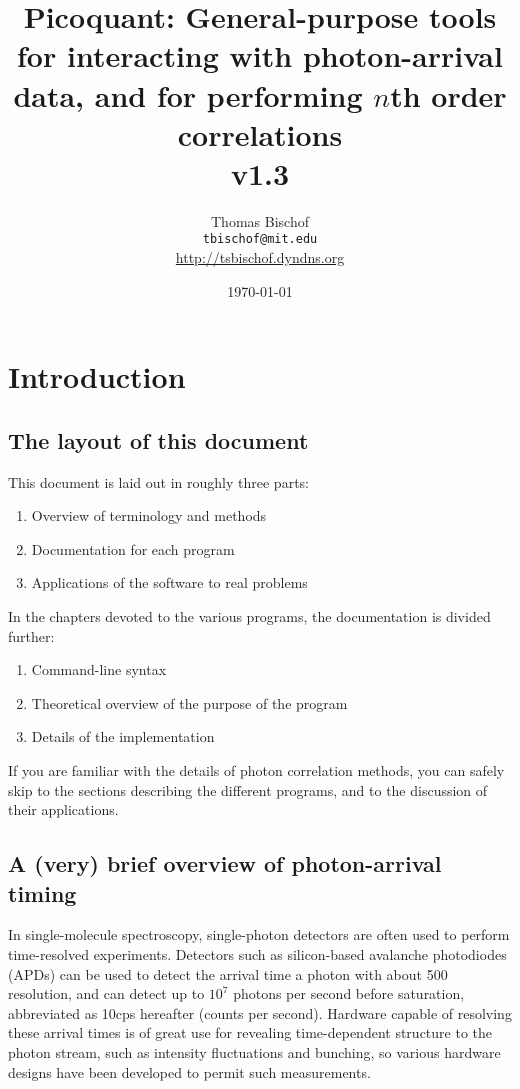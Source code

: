 \documentclass{article}
\title{Picoquant: General-purpose tools for interacting with photon-arrival data, and for performing $n$th order correlations \\ 
v1.3}
\author{Thomas Bischof \\ \texttt{tbischof@mit.edu} \\ \url{http://tsbischof.dyndns.org}}
\date{\today}
\newcommand{\cps}{\textnormal{cps}}
\begin{document}
\maketitle
\tableofcontents
 
\section{Introduction}
\subsection{The layout of this document}
This document is laid out in roughly three parts:
\begin{enumerate}
\item Overview of terminology and methods
\item Documentation for each program
\item Applications of the software to real problems
\end{enumerate}
In the chapters devoted to the various programs, the documentation is divided further:
\begin{enumerate}
\item Command-line syntax
\item Theoretical overview of the purpose of the program
\item Details of the implementation
\end{enumerate}
If you are familiar with the details of photon correlation methods, you can safely skip to the sections describing the different programs, and to the discussion of their applications. 

\subsection{A (very) brief overview of photon-arrival timing}
In single-molecule spectroscopy, single-photon detectors are often used to perform time-resolved experiments. Detectors such as silicon-based avalanche photodiodes (APDs) can be used to detect the arrival time a photon with about 500\pico\second{} resolution, and can detect up to $10^{7}$ photons per second before saturation, abbreviated as 10\mega\cps{} hereafter (counts per second). Hardware capable of resolving these arrival times is of great use for revealing time-dependent structure to the photon stream, such as intensity fluctuations and bunching, so various hardware designs have been developed to permit such measurements.
\end{document}
